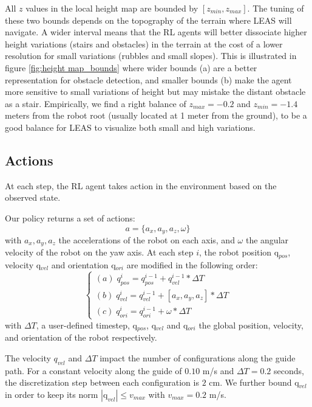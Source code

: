All $z$ values in the local height map are bounded by $[z_{min}, z_{max}]$. The tuning of these two bounds depends on the topography of the terrain where LEAS will navigate. 
A wider interval means that the RL agents will better dissociate higher height variations (stairs and obstacles) in the terrain at the cost of a lower resolution for small variations (rubbles and small slopes).
This is illustrated in figure \ref{fig:height map_bounds} where wider bounds (a) are a better representation for obstacle detection, and smaller bounds (b) make the agent more sensitive to small variations of height but may mistake the distant obstacle as a stair. 
Empirically, we find a right balance of $z_{max}= -0.2$ and $z_{min}= -1.4$ meters from the robot root (usually located at 1 meter from the ground), to be a good balance for LEAS to visualize both small and high variations.

\subsection{Actions\label{subsubsec:actions}}
At each step, the RL agent takes action in the environment based on the observed state. 

Our policy returns a set of actions: 
\begin{equation}
a = \{ a_x, a_y, a_z, \omega \}
\end{equation}
with $a_x, a_y, a_z$ the accelerations of the robot on each axis, and $\omega$ the angular velocity of the robot on the yaw axis. At each step $i$, the robot position q$_{pos}$, velocity q$_{vel}$ and orientation q$_{ori}$ are modified in the following order:
\begin{equation}
\begin{cases}
(a) \; q_{pos}^i = q_{pos}^{i-1} + q_{vel}^{i-1} * \Delta T \\

(b) \; q_{vel}^i = q_{vel}^{i-1} + [a_x, a_y, a_z] * \Delta T \\

(c) \; q_{ori}^i = q_{ori}^{i-1} + \omega * \Delta T 
\end{cases}
\end{equation}
with $\Delta T$, a user-defined timestep, q$_{pos}$, q$_{vel}$ and q$_{ori}$ the global position, velocity, and orientation of the robot respectively.

The velocity $q_{vel}$ and $\Delta T$ impact the number of configurations along the guide path. For a constant velocity along the guide of $0.10$ m/s and $\Delta T=0.2$ seconds, the discretization step between each configuration is $2$ cm. 
We further bound q$_{vel}$ in order to keep its norm $|\mbox{q}_{vel}| \leq v_{max}$ with $v_{max}=0.2$ m/s. %

